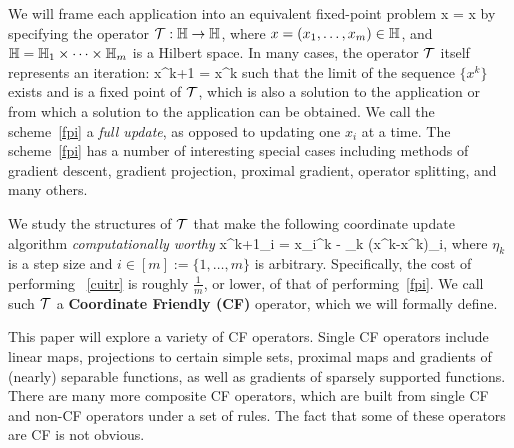 We will frame each application into an equivalent fixed-point problem
\beq\label{fpprob}
x = \cT x
\eeq
by specifying the operator  ${\mathcal{T}}:\mathbb{H} \to \mathbb{H}$, where $x=(x_1,\ldots,x_m)\in \mathbb{H}$, and $\mathbb{H}=\mathbb{H}_1\times \cdots \times \mathbb{H}_m$ is a Hilbert space.
In many cases, the operator ${\mathcal{T}}$ itself represents an iteration:
\beq\label{fpi}
x^{k+1} = \cT x^k
\eeq
such that the limit of the sequence $\{x^k\}$  exists and is a fixed point of ${\mathcal{T}}$, which is also a solution to the application or from which a solution to the application can be obtained. We call the scheme~\eqref{fpi} a \emph{full update}, as opposed to updating one $x_i$ at a time. The  scheme~\eqref{fpi} has a number of interesting special cases including  methods of gradient descent, gradient projection, proximal gradient,  operator splitting, and many others.

We study the structures of ${\mathcal{T}}$ that make the  following coordinate update algorithm \emph{computationally worthy}
\beq\label{cuitr}
x^{k+1}_i = x_i^k - \eta_k (x^k-\cT x^k)_i,
\eeq
where  $\eta_k$ is a  step size and $i\in [m] := \{1,\ldots,m\}$ is arbitrary. Specifically, the cost of performing ~\eqref{cuitr}  is roughly $\frac{1}{m}$, or lower, of that of performing~\eqref{fpi}. We call such ${\mathcal{T}}$ a \textbf{Coordinate Friendly (CF)} operator, which we will formally define.

This paper will explore a variety of CF operators. Single CF operators include linear maps, projections to certain simple sets, proximal maps and gradients of (nearly) separable functions, as well as gradients of sparsely supported functions. There are many more composite CF operators, which are built from single CF and non-CF operators under a set of rules.  The fact that some of these operators are CF is not obvious.

